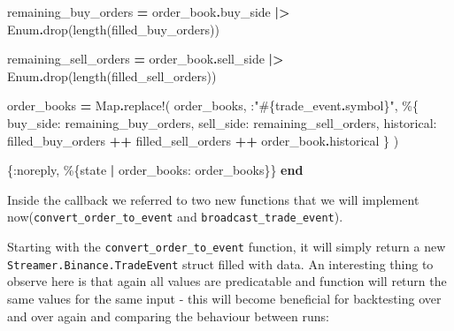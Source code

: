 \documentclass[
  oneside]{book}
\newenvironment{Shaded}{\begin{snugshade}}{\end{snugshade}}
\newcommand{\ConstantTok}[1]{\textcolor[rgb]{0.00,0.00,0.00}{#1}}
\newcommand{\KeywordTok}[1]{\textcolor[rgb]{0.13,0.29,0.53}{\textbf{#1}}}
\newcommand{\NormalTok}[1]{#1}
\newcommand{\OperatorTok}[1]{\textcolor[rgb]{0.81,0.36,0.00}{\textbf{#1}}}
\newcommand{\OtherTok}[1]{\textcolor[rgb]{0.56,0.35,0.01}{#1}}
\newcommand{\StringTok}[1]{\textcolor[rgb]{0.31,0.60,0.02}{#1}}
\newcommand{\VariableTok}[1]{\textcolor[rgb]{0.00,0.00,0.00}{#1}}
\begin{document}
\begin{Shaded}
\begin{Highlighting}[]
\NormalTok{    remaining\_buy\_orders }\OperatorTok{=}
\NormalTok{      order\_book}\OperatorTok{.}\NormalTok{buy\_side}
      \OperatorTok{|\textgreater{}} \ConstantTok{Enum}\OperatorTok{.}\NormalTok{drop(length(filled\_buy\_orders))}

\NormalTok{    remaining\_sell\_orders }\OperatorTok{=}
\NormalTok{      order\_book}\OperatorTok{.}\NormalTok{sell\_side}
      \OperatorTok{|\textgreater{}} \ConstantTok{Enum}\OperatorTok{.}\NormalTok{drop(length(filled\_sell\_orders))}

\NormalTok{    order\_books }\OperatorTok{=}
      \ConstantTok{Map}\OperatorTok{.}\NormalTok{replace!(}
\NormalTok{        order\_books,}
\NormalTok{        :}\StringTok{"}\OtherTok{\#\{}\NormalTok{trade\_event}\OperatorTok{.}\NormalTok{symbol}\OtherTok{\}}\StringTok{"}\NormalTok{,}
\NormalTok{        \%\{}
          \VariableTok{buy\_side:}\NormalTok{ remaining\_buy\_orders,}
          \VariableTok{sell\_side:}\NormalTok{ remaining\_sell\_orders,}
          \VariableTok{historical:}
\NormalTok{            filled\_buy\_orders }\OperatorTok{++}
\NormalTok{              filled\_sell\_orders }\OperatorTok{++}
\NormalTok{              order\_book}\OperatorTok{.}\NormalTok{historical}
\NormalTok{        \}}
\NormalTok{      )}

\NormalTok{    \{}\VariableTok{:noreply}\NormalTok{, \%\{state }\OperatorTok{|} \VariableTok{order\_books:}\NormalTok{ order\_books\}\}}
  \KeywordTok{end}
\end{Highlighting}
\end{Shaded}

Inside the callback we referred to two new functions that we will implement now(\texttt{convert\_order\_to\_event} and \texttt{broadcast\_trade\_event}).

Starting with the \texttt{convert\_order\_to\_event} function, it will simply return a new \texttt{Streamer.Binance.TradeEvent} struct filled with data. An interesting thing to observe here is that again all values are predicatable and function will return the same values for the same input - this will become beneficial for backtesting over and over again and comparing the behaviour between runs:
\end{document}
